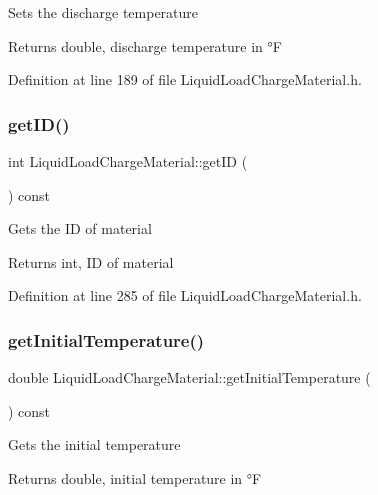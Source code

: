 Sets the discharge temperature \begin{DoxyReturn}{Returns}
double, discharge temperature in °F 
\end{DoxyReturn}


Definition at line 189 of file Liquid\+Load\+Charge\+Material.\+h.

\mbox{\label{class_liquid_load_charge_material_a92591f91c6ed9fdda10733a439e86389}} 
\subsubsection{\texorpdfstring{get\+I\+D()}{getID()}}
{\footnotesize\ttfamily int Liquid\+Load\+Charge\+Material\+::get\+ID (\begin{DoxyParamCaption}{ }\end{DoxyParamCaption}) const\hspace{0.3cm}{\ttfamily [inline]}}

Gets the ID of material \begin{DoxyReturn}{Returns}
int, ID of material 
\end{DoxyReturn}


Definition at line 285 of file Liquid\+Load\+Charge\+Material.\+h.

\mbox{\label{class_liquid_load_charge_material_ab80229a78f884fb07e756665a616d401}} 
\subsubsection{\texorpdfstring{get\+Initial\+Temperature()}{getInitialTemperature()}}
{\footnotesize\ttfamily double Liquid\+Load\+Charge\+Material\+::get\+Initial\+Temperature (\begin{DoxyParamCaption}{ }\end{DoxyParamCaption}) const\hspace{0.3cm}{\ttfamily [inline]}}

Gets the initial temperature \begin{DoxyReturn}{Returns}
double, initial temperature in °F 
\end{DoxyReturn}



